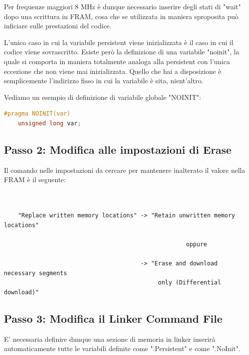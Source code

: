 \documentclass[LaM,binding=0.6cm,oneside]{../sapthesis}
\begin{document}
Per frequenze maggiori 8 MHz è dunque necessario inserire degli stati di "wait" dopo una scrittura in FRAM, cosa che se utilizzata in maniera sproposita può inficiare sulle prestazioni del codice.

L'unico caso in cui la variabile persistent viene inizializzata è il caso in cui il codice viene sovrascritto.
Esiste però la definizione di una variabile "noinit", la quale si comporta in maniera totalmente analoga alla persistent con
l'unica eccezione che non viene mai inizializzata.
Quello che hai a disposizione è semplicemente l'indirizzo fisso in cui la variabile è sita, nient'altro.

Vediamo un esempio di definizione di variabile globale "NOINIT":
\begin{lstlisting}[language=C]
    #pragma NOINIT(var)  
    unsigned long var;  
\end{lstlisting}

\subsection{Passo 2: Modifica alle impostazioni di Erase}
Il comando nelle impostazioni da cercare per mantenere inalterato il valore nella FRAM è il seguente:
\begin{verbatim}
    

    "Replace written memory locations" -> "Retain unwritten memory locations"
    
                                                    oppure
                                                    
                                       -> "Erase and download necessary segments 
                                            only (Differential download)"

\end{verbatim}
\subsection{Passo 3: Modifica il Linker Command File}
E' necessaria definire dunque una sezione di memoria in linker inserirà automaticamente tutte le variabili definite come ".Persistent" e come ".NoInit".
\end{document}
